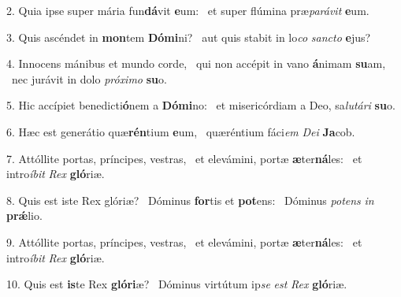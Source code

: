 2. Quia ipse super mária fun\textbf{dá}vit \textbf{e}um: \ast\  et super flúmina præ\textit{pa}\textit{rá}\textit{vit} \textbf{e}um.\

3. Quis ascéndet in \textbf{mon}tem \textbf{Dó}\textbf{mi}ni? \ast\  aut quis stabit in lo\textit{co} \textit{sanc}\textit{to} \textbf{e}jus?\

4. Innocens mánibus et mundo corde, \dag\  qui non accépit in vano \textbf{á}nimam \textbf{su}am, \ast\  nec jurávit in dolo \textit{pró}\textit{xi}\textit{mo} \textbf{su}o.\

5. Hic accípiet benedicti\textbf{ó}nem a \textbf{Dó}\textbf{mi}no: \ast\  et misericórdiam a Deo, sa\textit{lu}\textit{tá}\textit{ri} \textbf{su}o.\

6. Hæc est generátio quæ\textbf{rén}tium \textbf{e}um, \ast\  quæréntium fáci\textit{em} \textit{De}\textit{i} \textbf{Ja}cob.\

7. Attóllite portas, príncipes, vestras, \dag\  et elevámini, portæ \textbf{æ}ter\textbf{ná}les: \ast\  et intro\textit{í}\textit{bit} \textit{Rex} \textbf{gló}riæ.\

8. Quis est iste Rex glóriæ? \dag\  Dóminus \textbf{for}tis et \textbf{pot}ens: \ast\  Dóminus \textit{pot}\textit{ens} \textit{in} \textbf{prǽ}lio.\

9. Attóllite portas, príncipes, vestras, \dag\  et elevámini, portæ \textbf{æ}ter\textbf{ná}les: \ast\  et intro\textit{í}\textit{bit} \textit{Rex} \textbf{gló}riæ.\

10. Quis est \textbf{is}te Rex \textbf{gló}\textbf{ri}æ? \ast\  Dóminus virtútum ip\textit{se} \textit{est} \textit{Rex} \textbf{gló}riæ.\

